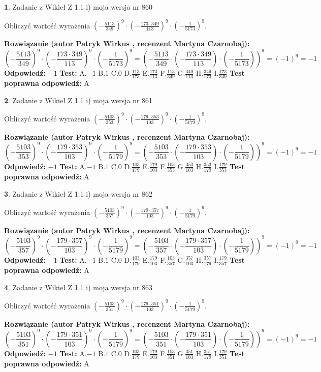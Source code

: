\documentclass[12pt, a4paper]{article}
\theoremstyle{definition} %
\newtheorem{zad}{}
\newcommand{\zadStart}[1]{\begin{zad}#1\newline}
\newcommand{\zadStop}{\end{zad}}
\newcommand{\rozwStart}[2]{\noindent \textbf{Rozwiązanie (autor #1 , recenzent #2): }\newline}
\newcommand{\rozwStop}{\newline}
\newcommand{\odpStart}{\noindent \textbf{Odpowiedź:}\newline}
\newcommand{\odpStop}{\newline}
\newcommand{\testStart}{\noindent \textbf{Test:}\newline}
\newcommand{\testStop}{\newline}
\newcommand{\kluczStart}{\noindent \textbf{Test poprawna odpowiedź:}\newline}
\newcommand{\kluczStop}{\newline}
\begin{document}
\zadStart{Zadanie z Wikieł Z 1.1 i) moja wersja nr 860}

Obliczyć wartość wyrażenia $(-\frac{5113}{349})^{9} \cdot (-\frac{173 \cdot 349}{113})^{9} \cdot (-\frac{1}{5173})^{9}$.
\zadStop
\rozwStart{Patryk Wirkus}{Martyna Czarnobaj}
$$(-\frac{5113}{349})^{9} \cdot (-\frac{173 \cdot 349}{113})^{9} \cdot (-\frac{1}{5173})^{9} = (-\frac{5113}{349} \cdot (-\frac{173 \cdot 349}{113}) \cdot (-\frac{1}{5173}))^{9} = (-1)^{9} = -1$$
\rozwStop
\odpStart
$-1$
\odpStop
\testStart
A.$-1$ B.$1$ C.$0$ D.$\frac{113}{173}$ E.$\frac{173}{113}$
F.$\frac{113}{349}$ G.$\frac{349}{113}$
H.$\frac{349}{173}$
I.$\frac{173}{349}$
\testStop
\kluczStart
A
\kluczStop



\zadStart{Zadanie z Wikieł Z 1.1 i) moja wersja nr 861}

Obliczyć wartość wyrażenia $(-\frac{5103}{353})^{9} \cdot (-\frac{179 \cdot 353}{103})^{9} \cdot (-\frac{1}{5179})^{9}$.
\zadStop
\rozwStart{Patryk Wirkus}{Martyna Czarnobaj}
$$(-\frac{5103}{353})^{9} \cdot (-\frac{179 \cdot 353}{103})^{9} \cdot (-\frac{1}{5179})^{9} = (-\frac{5103}{353} \cdot (-\frac{179 \cdot 353}{103}) \cdot (-\frac{1}{5179}))^{9} = (-1)^{9} = -1$$
\rozwStop
\odpStart
$-1$
\odpStop
\testStart
A.$-1$ B.$1$ C.$0$ D.$\frac{103}{179}$ E.$\frac{179}{103}$
F.$\frac{103}{353}$ G.$\frac{353}{103}$
H.$\frac{353}{179}$
I.$\frac{179}{353}$
\testStop
\kluczStart
A
\kluczStop



\zadStart{Zadanie z Wikieł Z 1.1 i) moja wersja nr 862}

Obliczyć wartość wyrażenia $(-\frac{5103}{357})^{9} \cdot (-\frac{179 \cdot 357}{103})^{9} \cdot (-\frac{1}{5179})^{9}$.
\zadStop
\rozwStart{Patryk Wirkus}{Martyna Czarnobaj}
$$(-\frac{5103}{357})^{9} \cdot (-\frac{179 \cdot 357}{103})^{9} \cdot (-\frac{1}{5179})^{9} = (-\frac{5103}{357} \cdot (-\frac{179 \cdot 357}{103}) \cdot (-\frac{1}{5179}))^{9} = (-1)^{9} = -1$$
\rozwStop
\odpStart
$-1$
\odpStop
\testStart
A.$-1$ B.$1$ C.$0$ D.$\frac{103}{179}$ E.$\frac{179}{103}$
F.$\frac{103}{357}$ G.$\frac{357}{103}$
H.$\frac{357}{179}$
I.$\frac{179}{357}$
\testStop
\kluczStart
A
\kluczStop



\zadStart{Zadanie z Wikieł Z 1.1 i) moja wersja nr 863}

Obliczyć wartość wyrażenia $(-\frac{5103}{351})^{9} \cdot (-\frac{179 \cdot 351}{103})^{9} \cdot (-\frac{1}{5179})^{9}$.
\zadStop
\rozwStart{Patryk Wirkus}{Martyna Czarnobaj}
$$(-\frac{5103}{351})^{9} \cdot (-\frac{179 \cdot 351}{103})^{9} \cdot (-\frac{1}{5179})^{9} = (-\frac{5103}{351} \cdot (-\frac{179 \cdot 351}{103}) \cdot (-\frac{1}{5179}))^{9} = (-1)^{9} = -1$$
\rozwStop
\odpStart
$-1$
\odpStop
\testStart
A.$-1$ B.$1$ C.$0$ D.$\frac{103}{179}$ E.$\frac{179}{103}$
F.$\frac{103}{351}$ G.$\frac{351}{103}$
H.$\frac{351}{179}$
I.$\frac{179}{351}$
\testStop
\kluczStart
A
\kluczStop
\end{document}
